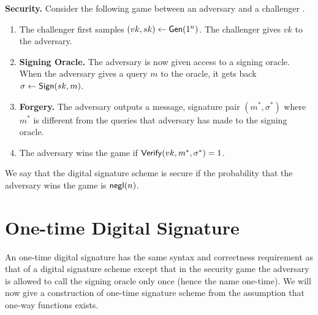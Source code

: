 \medskip
\noindent\textbf{Security.} Consider the following game between an adversary and a challenger
.

\begin{enumerate}
    \item The challenger first samples $(vk,sk) \gets \mathsf{Gen}(1^n)$. The challenger gives $vk$ to the adversary.
    \item \textbf{Signing Oracle.} The adversary is now given access to a signing oracle. When the adversary gives a query $m$ to the oracle, it gets back $\sigma \gets \mathsf{Sign}(sk,m)$.
    \item \textbf{Forgery.} The adversary outputs a message, signature pair $(m^*,\sigma^*)$ where $m^*$ is different from the queries that adversary has made to the signing oracle.
    \item The adversary wins the game if $\mathsf{Verify}(vk,m^*,\sigma^*) = 1$.
\end{enumerate}
We say that the digital signature scheme is secure if the probability that the adversary wins the game is $\mathsf{negl}(n)$.

\section{One-time Digital Signature}
\label{lampart}
An one-time digital signature has the same syntax and correctness requirement as that of a digital signature scheme except that in the security game the adversary is allowed to call the signing oracle only once (hence the name one-time). We will now give a construction of one-time signature scheme from the assumption that one-way functions exists.

